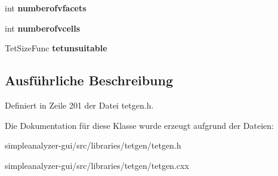 \begin{DoxyCompactItemize}
\item 
\hypertarget{classtetgenio_a054e5d022a3e6c6cb490975487390bba}{int {\bfseries numberofvfacets}}\label{classtetgenio_a054e5d022a3e6c6cb490975487390bba}

\item 
\hypertarget{classtetgenio_afbc917d5c352817d0668170f71bb8404}{int {\bfseries numberofvcells}}\label{classtetgenio_afbc917d5c352817d0668170f71bb8404}

\item 
\hypertarget{classtetgenio_ad57af35c7c480da03af06b1388a4a8f7}{Tet\-Size\-Func {\bfseries tetunsuitable}}\label{classtetgenio_ad57af35c7c480da03af06b1388a4a8f7}

\end{DoxyCompactItemize}


\subsection{Ausführliche Beschreibung}


Definiert in Zeile 201 der Datei tetgen.\-h.



Die Dokumentation für diese Klasse wurde erzeugt aufgrund der Dateien\-:\begin{DoxyCompactItemize}
\item 
simpleanalyzer-\/gui/src/libraries/tetgen/tetgen.\-h\item 
simpleanalyzer-\/gui/src/libraries/tetgen/tetgen.\-cxx\end{DoxyCompactItemize}
